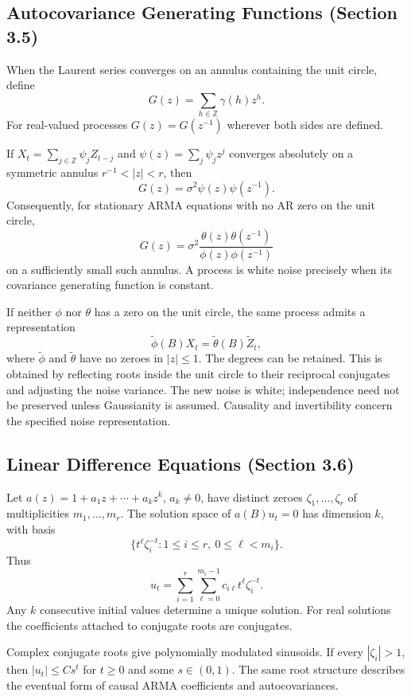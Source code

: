 \subsection{Autocovariance Generating Functions (Section 3.5)}
\begin{definition}
When the Laurent series converges on an annulus containing the unit circle,
define
\[
G(z)=\sum_{h\in\mathbb Z}\gamma(h)z^h.
\]
For real-valued processes $G(z)=G(z^{-1})$ wherever both sides are defined.
\end{definition}
\begin{proposition}
If $X_t=\sum_{j\in\mathbb Z}\psi_jZ_{t-j}$ and
$\psi(z)=\sum_j\psi_jz^j$ converges absolutely on a symmetric annulus
$r^{-1}<|z|<r$, then
\[
G(z)=\sigma^2\psi(z)\psi(z^{-1}).
\]
Consequently, for stationary ARMA equations with no AR zero on the unit circle,
\[
G(z)=\sigma^2\frac{\theta(z)\theta(z^{-1})}
{\phi(z)\phi(z^{-1})}
\]
on a sufficiently small such annulus. A process is white noise precisely
when its covariance generating function is constant.
\end{proposition}
\begin{proposition}
If neither $\phi$ nor $\theta$ has a zero on the unit circle, the same process
admits a representation
\[
\widetilde\phi(B)X_t=\widetilde\theta(B)\widetilde Z_t,
\]
where $\widetilde\phi$ and $\widetilde\theta$ have no zeroes in $|z|\le1$.
The degrees can be retained. This is obtained by reflecting roots inside
the unit circle to their reciprocal conjugates and adjusting the noise variance.
The new noise is white; independence need not be preserved unless Gaussianity
is assumed. Causality and invertibility concern the specified noise representation.
\end{proposition}

\subsection{Linear Difference Equations (Section 3.6)}
\begin{theorem}
Let $a(z)=1+a_1z+\cdots+a_kz^k$, $a_k\ne0$, have distinct zeroes
$\zeta_1,\ldots,\zeta_r$ of multiplicities $m_1,\ldots,m_r$.
The solution space of $a(B)u_t=0$ has dimension $k$, with basis
\[
\{t^\ell\zeta_i^{-t}:1\le i\le r,\ 0\le\ell<m_i\}.
\]
Thus
\[
u_t=\sum_{i=1}^{r}\sum_{\ell=0}^{m_i-1}c_{i\ell}t^\ell\zeta_i^{-t}.
\]
Any $k$ consecutive initial values determine a unique solution. For real
solutions the coefficients attached to conjugate roots are conjugates.
\end{theorem}
Complex conjugate roots give polynomially modulated sinusoids. If every
$|\zeta_i|>1$, then $|u_t|\le C s^t$ for $t\ge0$ and some $s\in(0,1)$.
The same root structure describes the eventual form of causal ARMA
coefficients and autocovariances.


